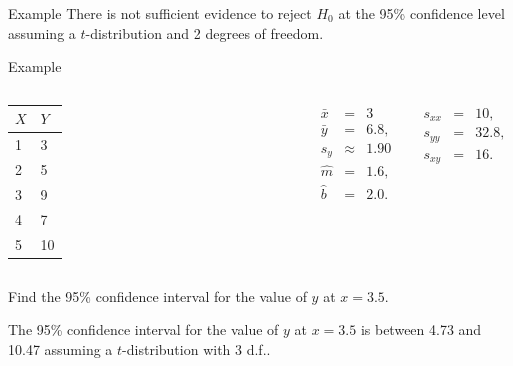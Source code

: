 \begin{frame}{Example}
      {
        There is {\color{red}not} sufficient evidence to reject $H_0$
        at the 95\% confidence level assuming a $t$-distribution and 2
        degrees of freedom.
      }


\end{frame}


\begin{frame}{Example}


    \begin{columns}

      \begin{tabular}{l|l}
        $X$ & $Y$ \\ \hline
        1 & 3 \\
        2 & 5  \\
        3 & 9 \\
        4 & 7  \\
        5 & 10
      \end{tabular}


      \begin{eqnarray*}
        \bar{x} & = & 3 \\
        \bar{y} & = & 6.8, \\
        s_y & \approx & 1.90 \\
        \hat{m} & = & 1.6, \\
        \hat{b} & = & 2.0.
      \end{eqnarray*}


      \begin{eqnarray*}
        s_{xx} & = & 10, \\
        s_{yy} & = & 32.8, \\
        s_{xy} & = & 16.
      \end{eqnarray*}

    \end{columns}


    \vfill 


      Find the 95\% confidence interval for the value of $y$ at $x=3.5$.

      {

        The 95\% confidence interval for the value of $y$ at $x=3.5$
        is between 4.73 and 10.47 assuming a $t$-distribution with 3 d.f..
      }


\end{frame}


